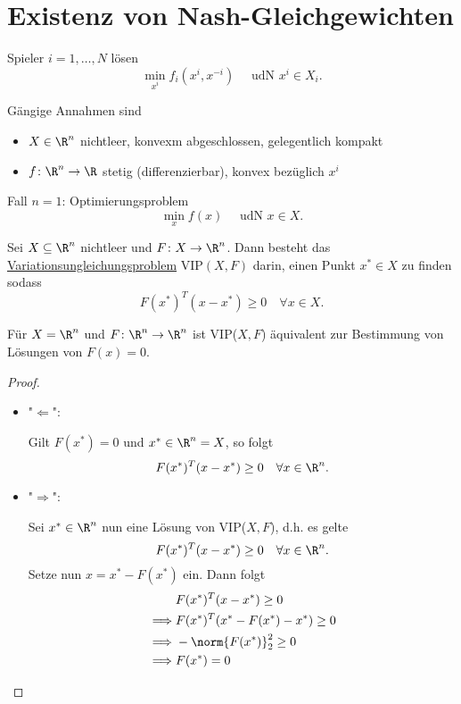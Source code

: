 \chapter{Existenz von Nash-Gleichgewichten}%
\label{cha:Existenz von Nash-Gleichgewichten}

Spieler $i = 1, \ldots, N$ lösen
\[
	\min\limits_{x^{i}} f_{i}(x^{i}, x^{-i}) \quad \text{ udN } x^{i} \in X_{i}
.\] 

Gängige Annahmen sind
\begin{itemize}
	\item $X \in \R^{n}$ nichtleer, konvexm abgeschlossen, gelegentlich kompakt
	\item $f \colon \R^{n} \rightarrow \R $ stetig (differenzierbar), konvex bezüglich $x^{i}$
\end{itemize}

Fall $n=1$: Optimierungsproblem
\[
	\min\limits_{x}f(x) \quad \text{ udN } x \in X
.\] 

\begin{definition}
\label{thm:variationsungleichung}
Sei $X \subseteq \R^{n}$ nichtleer und $F \colon X \rightarrow \R^{n} $. Dann besteht das \enter
\underline{Variationsungleichungsproblem} $\text{VIP}(X,F)$ darin, einen Punkt ${x}^{*} \in X$ zu finden sodass
\[
	F({x}^{*})^{T}(x-{x}^{*}) \geq  0 \quad \forall x \in X
.\] 
\end{definition}

\begin{lemma}
\label{thm:lemmavariation}
Für $X=\R^{n}$ und $F \colon \R^{n} \rightarrow \R^{n} $ ist VIP($X,F$) äquivalent zur Bestimmung von Lösungen von $F(x) = 0$.
\end{lemma}

\begin{proof}
\label{thm:lemmavariationbeweis}
\begin{itemize}
	\item "$\Longleftarrow$":

		Gilt $F({x}^{*})=0$ und ${x}^{*} \in \R^{n} = X$, so folgt
		\[
			F({x}^{*})^{T}(x-{x}^{*}) \geq  0 \quad \forall x \in \R^{n}
		.\] 
	\item "$\Longrightarrow$":

		Sei ${x}^{*} \in \R^{n}$ nun eine Lösung von VIP($X,F$), d.h. es gelte
		\[
			F({x}^{*})^{T}(x-{x}^{*}) \geq  0 \quad \forall x \in \R^{n}
		.\] 
		Setze nun $x = {x}^{*} - F({x}^{*})$ ein. Dann folgt
		\begin{align*}
			&F({x}^{*})^{T}(x-{x}^{*}) \geq  0 \\
			\implies
			&F({x}^{*})^{T}({x}^{*}-F({x}^{*})-{x}^{*}) \geq  0 \\
			\implies
			&-\norm{F({x}^{*})} _{2}^2 \geq  0 \\
			\implies
			&F({x}^{*}) = 0
		\end{align*}
\end{itemize}
\end{proof}

